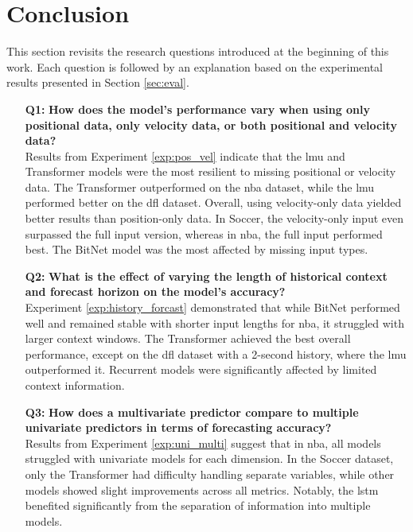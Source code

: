 \chapter{Conclusion}
\label{sec:conclusion}
This section revisits the research questions introduced at the beginning of this work. Each question is followed by an explanation based on the experimental results presented in Section \ref{sec:eval}.

\begin{itemize}
    \item[\textbf{Q1:}] \textbf{How does the model's performance vary when using only positional data, only velocity data, or both positional and velocity data?} \\
    Results from Experiment \ref{exp:pos_vel} indicate that the \gls{lmu} and Transformer models were the most resilient to missing positional or velocity data. The Transformer outperformed on the \gls{nba} dataset, while the \gls{lmu} performed better on the \gls{dfl} dataset. Overall, using velocity-only data yielded better results than position-only data. In Soccer, the velocity-only input even surpassed the full input version, whereas in \gls{nba}, the full input performed best. The BitNet model was the most affected by missing input types.

    \item[\textbf{Q2:}] \textbf{What is the effect of varying the length of historical context and forecast horizon on the model's accuracy?} \\
    Experiment \ref{exp:history_forcast} demonstrated that while BitNet performed well and remained stable with shorter input lengths for \gls{nba}, it struggled with larger context windows. The Transformer achieved the best overall performance, except on the \gls{dfl} dataset with a 2-second history, where the \gls{lmu} outperformed it. Recurrent models were significantly affected by limited context information.

    \item[\textbf{Q3:}] \textbf{How does a multivariate predictor compare to multiple univariate predictors in terms of forecasting accuracy?} \\
    Results from Experiment \ref{exp:uni_multi} suggest that in \gls{nba}, all models struggled with univariate models for each dimension. In the Soccer dataset, only the Transformer had difficulty handling separate variables, while other models showed slight improvements across all metrics. Notably, the \gls{lstm} benefited significantly from the separation of information into multiple models.


\end{itemize}
